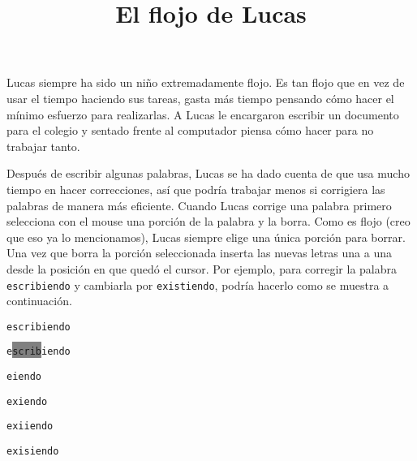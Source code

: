 \documentclass{oci}
\title{El flojo de Lucas}
\begin{document}
\begin{problemDescription}
  Lucas siempre ha sido un niño extremadamente flojo.
  Es tan flojo que en vez de usar el tiempo haciendo sus tareas, gasta más tiempo 
  pensando cómo hacer el mínimo esfuerzo para realizarlas.
  A Lucas le encargaron escribir un documento para el colegio y 
  sentado frente al computador piensa cómo hacer para no trabajar
  tanto.

  Después de escribir algunas palabras, %
  Lucas se ha dado cuenta de que   %
  usa mucho tiempo en hacer correcciones, así que podría trabajar menos si
  corrigiera las palabras de manera más eficiente.
  Cuando Lucas corrige una palabra primero selecciona con el mouse una porción
  de la palabra y la borra. Como es flojo (creo que eso ya lo mencionamos), Lucas
  siempre elige una única porción para borrar.
  Una vez que borra la porción seleccionada inserta las nuevas letras una a una
  desde la posición en que quedó el cursor. %
  Por ejemplo, para corregir la palabra \texttt{escribiendo} y cambiarla por
  \texttt{existiendo}, podría hacerlo como se muestra a continuación.

  \newcommand{\caret}{{\color{gray}\hspace{-0.2em}\raisebox{-0.05em}{\scalebox{1.1}{|}}\hspace{-0.24em}}}
  \begin{center}
  \begin{minipage}{100pt}
    \texttt{escribiendo}

    \texttt{e\colorbox{gray}{\hspace{-0.24em}scrib\hspace{-0.24em}}iendo}

    \texttt{e\caret{}iendo}

    \texttt{ex\caret{}iendo}

    \texttt{exi\caret{}iendo}
    
    \texttt{exis\caret{}iendo}


\end{minipage}
\end{center}
\end{problemDescription}
\end{document}
